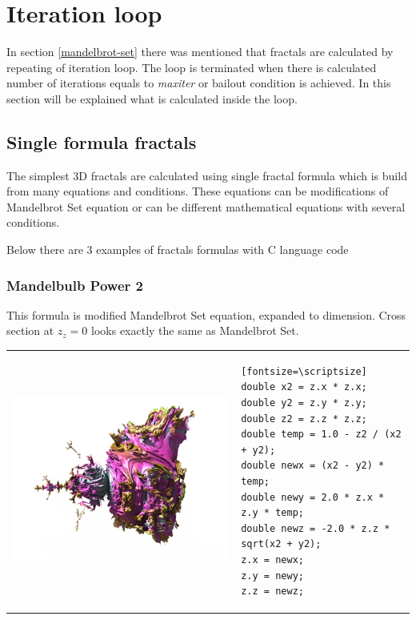 \section{Iteration loop}\label{iteration-loop}

In section \ref{mandelbrot-set} there was mentioned that fractals are calculated
by repeating of iteration loop. The loop is terminated when there is calculated
number of iterations equals to \emph{maxiter} or bailout condition is achieved.
In this section will be explained what is calculated inside the loop.

\subsection{Single formula fractals}\label{single-formula-fractals}

The simplest 3D fractals are calculated using single fractal formula which is
build from many equations and conditions. These equations can be modifications
of Mandelbrot Set equation or can be different mathematical equations with
several conditions.

Below there are 3 examples of fractals formulas with C language code

\subsubsection{Mandelbulb Power 2} \nopagebreak

This formula is modified Mandelbrot Set equation, expanded to  dimension.
Cross section at $ z_z = 0 $ looks exactly the same as Mandelbrot Set.
\nopagebreak

\begin{tabular}{l l}
	\includegraphics[width=0.3\linewidth]{img/manual/media/formula_mandelbulb_power_2}	
	& 
	\begin{minipage}[b]{0.5\linewidth}
		\begin{verbatim}[fontsize=\scriptsize]
double x2 = z.x * z.x;
double y2 = z.y * z.y;
double z2 = z.z * z.z;
double temp = 1.0 - z2 / (x2 + y2);
double newx = (x2 - y2) * temp;
double newy = 2.0 * z.x * z.y * temp;
double newz = -2.0 * z.z * sqrt(x2 + y2);
z.x = newx;
z.y = newy;
z.z = newz;
		\end{verbatim}
	\end{minipage}
\end{tabular} 

